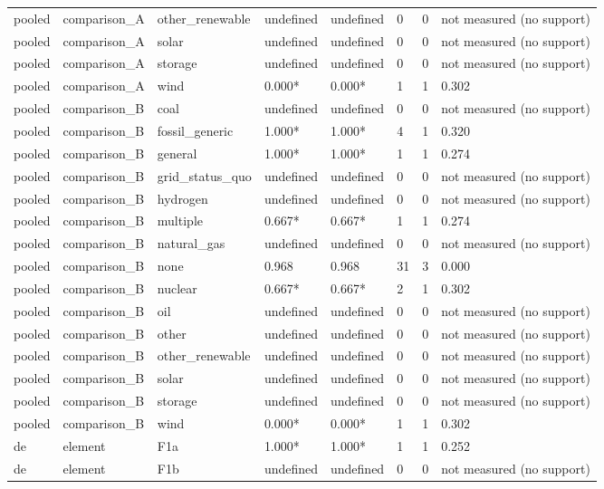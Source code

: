 \begin{table}[htbp]
\begin{tabular}{llllllll}
pooled & comparison\_A & other\_renewable & undefined & undefined & 0 & 0 & not measured (no support) \\
pooled & comparison\_A & solar & undefined & undefined & 0 & 0 & not measured (no support) \\
pooled & comparison\_A & storage & undefined & undefined & 0 & 0 & not measured (no support) \\
pooled & comparison\_A & wind & 0.000* & 0.000* & 1 & 1 & 0.302 \\
pooled & comparison\_B & coal & undefined & undefined & 0 & 0 & not measured (no support) \\
pooled & comparison\_B & fossil\_generic & 1.000* & 1.000* & 4 & 1 & 0.320 \\
pooled & comparison\_B & general & 1.000* & 1.000* & 1 & 1 & 0.274 \\
pooled & comparison\_B & grid\_status\_quo & undefined & undefined & 0 & 0 & not measured (no support) \\
pooled & comparison\_B & hydrogen & undefined & undefined & 0 & 0 & not measured (no support) \\
pooled & comparison\_B & multiple & 0.667* & 0.667* & 1 & 1 & 0.274 \\
pooled & comparison\_B & natural\_gas & undefined & undefined & 0 & 0 & not measured (no support) \\
pooled & comparison\_B & none & 0.968 & 0.968 & 31 & 3 & 0.000 \\
pooled & comparison\_B & nuclear & 0.667* & 0.667* & 2 & 1 & 0.302 \\
pooled & comparison\_B & oil & undefined & undefined & 0 & 0 & not measured (no support) \\
pooled & comparison\_B & other & undefined & undefined & 0 & 0 & not measured (no support) \\
pooled & comparison\_B & other\_renewable & undefined & undefined & 0 & 0 & not measured (no support) \\
pooled & comparison\_B & solar & undefined & undefined & 0 & 0 & not measured (no support) \\
pooled & comparison\_B & storage & undefined & undefined & 0 & 0 & not measured (no support) \\
pooled & comparison\_B & wind & 0.000* & 0.000* & 1 & 1 & 0.302 \\
de & element & F1a & 1.000* & 1.000* & 1 & 1 & 0.252 \\
de & element & F1b & undefined & undefined & 0 & 0 & not measured (no support) \\

\end{tabular}
\end{table}
